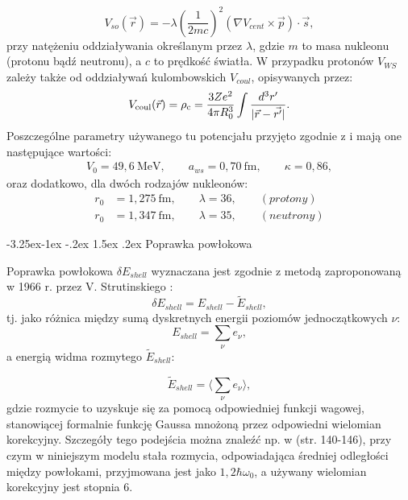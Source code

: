\documentclass[a4paper,polish]{article}
\makeatletter
\renewcommand\subsubsection{\@startsection{subsubsection}{3}{\z@}%
	{-3.25ex\@plus -1ex \@minus -.2ex}%
	{1.5ex \@plus .2ex}%
	{\normalfont\normalsize\bfseries\boldmath}}
\numberwithin{equation}{section}
\makeatother
\begin{document}
\begin{equation}
V_{so}(\vec{r})=-\lambda\left(\frac{1}{2mc}\right)^2 \left( \nabla V_{cent}  \times\vec{p} \right) \cdot \vec{s} ,
\end{equation}
przy natężeniu oddziaływania określanym przez $\lambda$, gdzie $m$ to masa nukleonu (protonu bądź neutronu), a $c$ to prędkość światła. W przypadku protonów $V_{WS}$ zależy także od oddziaływań kulombowskich $V_{coul}$, opisywanych przez:
\begin{equation}
V_{\rm coul}(\vec{r})=\rho_{\rm c}=\frac{3Ze^2}{4\pi R_0^3} \int\frac{d^3r'}{|\vec{r}-\vec{r'}|}.
\end{equation}
Poszczególne parametry używanego tu potencjału przyjęto zgodnie z \cite{WS} i mają one następujące wartości:
\begin{gather*}
V_0=49,6~\mathrm{MeV}, \qquad a_{ws}=0,70~\mathrm{fm}, \qquad \kappa=0,86,
\end{gather*}
oraz dodatkowo, dla dwóch rodzajów nukleonów:
\begin{align*}
r_0&=1,275~\mathrm{fm}, \qquad \lambda=36, \qquad (protony) \\
r_0&=1,347~\mathrm{fm}, \qquad \lambda=35, \qquad (neutrony)
\end{align*}

\subsubsection{Poprawka powłokowa}

Poprawka powłokowa $\delta E_{shell}$ wyznaczana jest zgodnie z metodą zaproponowaną w 1966 r. przez V. Strutinskiego \cite{Strutin}:
\begin{equation}\label{ESH}
\delta E_{shell}=E_{shell}-\widetilde{E}_{shell},
\end{equation}
tj. jako różnica między sumą dyskretnych energii poziomów jednoczątkowych $\nu$:  
\begin{equation}
E_{shell}=\sum_{\nu} e_{\nu},
\end{equation}
a energią widma rozmytego $\widetilde{E}_{shell}$:

\begin{equation}
\widetilde{E}_{shell}= \langle \sum_{\nu} e_{\nu} \rangle,
\end{equation}
gdzie rozmycie to uzyskuje się za pomocą odpowiedniej funkcji wagowej, stanowiącej formalnie funkcję Gaussa mnożoną przez odpowiedni wielomian korekcyjny. Szczegóły tego podejścia można znaleźć np. w \cite{Pomorski} (str. 140-146), przy czym w niniejszym modelu stała rozmycia, odpowiadająca średniej odległości między powłokami, przyjmowana jest jako $1,2\hbar \omega_{0}$, a używany wielomian korekcyjny jest stopnia 6.
\end{document}
